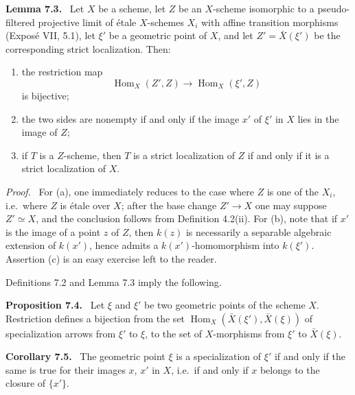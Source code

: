 \documentclass[11pt]{article}
\newcommand{\Hom}{\operatorname{Hom}}
\newcommand{\ie}{i.e.\ }
\newenvironment{statement}[1]{\par\medskip\noindent\textbf{#1.}\ }{\par\medskip}
\newenvironment{prooftext}{\par\noindent\emph{Proof.}\ }{\par\medskip}
\begin{document}
\begin{statement}{Lemma 7.3}
Let \(X\) be a scheme, let \(Z\) be an \(X\)-scheme isomorphic to a pseudo-filtered projective limit of \'etale \(X\)-schemes \(X_i\) with affine transition morphisms (Expos\'e VII, 5.1), let \(\xi'\) be a geometric point of \(X\), and let \(Z'=\bar X(\xi')\) be the corresponding strict localization. Then:
\begin{enumerate}[label=\alph*)]
\item the restriction map
\[
\Hom_X(Z',Z)\longrightarrow \Hom_X(\xi',Z)
\]
is bijective;
\item the two sides are nonempty if and only if the image \(x'\) of \(\xi'\) in \(X\) lies in the image of \(Z\);
\item if \(T\) is a \(Z\)-scheme, then \(T\) is a strict localization of \(Z\) if and only if it is a strict localization of \(X\).
\end{enumerate}
\end{statement}

\begin{prooftext}
For (a), one immediately reduces to the case where \(Z\) is one of the \(X_i\), \ie where \(Z\) is \'etale over \(X\); after the base change \(Z'\to X\) one may suppose \(Z'\simeq X\), and the conclusion follows from Definition 4.2(ii). For (b), note that if \(x'\) is the image of a point \(z\) of \(Z\), then \(k(z)\) is necessarily a separable algebraic extension of \(k(x')\), hence admits a \(k(x')\)-homomorphism into \(k(\xi')\). Assertion (c) is an easy exercise left to the reader.
\end{prooftext}

Definitions 7.2 and Lemma 7.3 imply the following.

\begin{statement}{Proposition 7.4}
Let \(\xi\) and \(\xi'\) be two geometric points of the scheme \(X\). Restriction defines a bijection from the set \(\Hom_X(\bar X(\xi'),\bar X(\xi))\) of specialization arrows from \(\xi'\) to \(\xi\), to the set of \(X\)-morphisms from \(\xi'\) to \(\bar X(\xi)\).
\end{statement}

\begin{statement}{Corollary 7.5}
The geometric point \(\xi\) is a specialization of \(\xi'\) if and only if the same is true for their images \(x\), \(x'\) in \(X\), \ie if and only if \(x\) belongs to the closure of \(\{x'\}\).
\end{statement}
\end{document}
